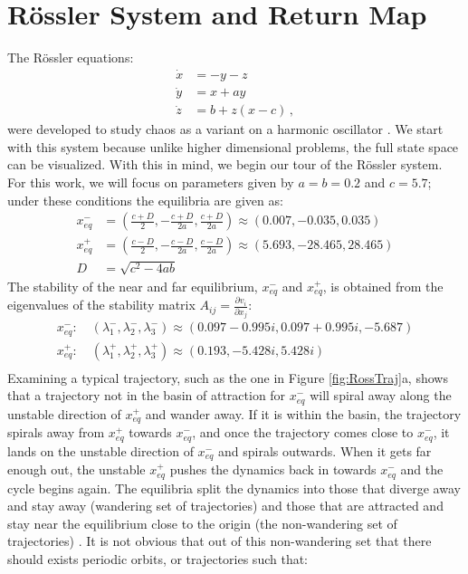 \documentclass[aip,cha,reprint,
secnumarabic,
nofootinbib, tightenlines,
nobibnotes, showkeys, showpacs,
groupedaddress
]{revtex4-1}
\begin{document}
\section{R\"ossler System and Return Map}
\label{sec:Ross}
The R\"ossler equations:
\begin{equation}
\begin{split}
  \dot x &= -y -z \\
  \dot y &= x + a y \\
  \dot z &= b + z (x - c) \,,
  \label{eq:Rossler}
\end{split}
\end{equation}
were developed to study chaos as a variant on a harmonic oscillator \cite{CB}.  We start with this system because unlike higher dimensional problems, the full state space can be visualized.  With this in mind, we begin our tour of the R\"ossler system.
For this work, we will focus on parameters given by $a = b = 0.2$ and $c = 5.7$; under these conditions the equilibria are given as:
\begin{equation}
\begin{split}
x_{eq}^{-} &= (\frac{c+D}{2}, -\frac{c+D}{2a}, \frac{c+D}{2a}) \approx (0.007,-0.035,0.035)\\
x_{eq}^{+} &= (\frac{c-D}{2}, -\frac{c-D}{2a}, \frac{c-D}{2a}) \approx (5.693,-28.465,28.465) \\
D &= \sqrt{c^2-4ab}
\end{split}
\label{eq:RossEq}
\end{equation}
The stability of the near and far equilibrium, $x_{eq}^{-}$ and $x_{eq}^{+}$, is obtained from the eigenvalues of the stability matrix $A_{ij} = \frac{\partial{v_{i}}}{\partial{x_{j}}}$:
\begin{equation}
\begin{split}
x_{eq}^{-} : \quad (\lambda_1^-, \lambda_2^-, \lambda_3^-) \approx (0.097-0.995i, 0.097+0.995i, -5.687) \\
x_{eq}^{+} : \quad (\lambda_1^+, \lambda_2^+, \lambda_3^+) \approx (0.193, -5.428i, 5.428i) \\
\end{split}
\label{eq:RossStab}
\end{equation}
Examining a typical trajectory, such as the one in Figure \ref{fig:RossTraj}a, shows that a trajectory not in the basin of attraction for $x_{eq}^{-}$ will spiral away along the unstable direction of $x_{eq}^{+}$ and wander away.  If it is within the basin, the trajectory spirals away from $x_{eq}^{+}$ towards $x_{eq}^{-}$, and once the trajectory comes close to $x_{eq}^{-}$, it lands on the unstable direction of $x_{eq}^{-}$ and spirals outwards.  When it gets far enough out, the unstable $x_{eq}^{+}$ pushes the dynamics back in towards $x_{eq}^{-}$ and the cycle begins again.  The equilibria split the dynamics into those that diverge away and stay away (wandering set of trajectories) and those that are attracted and stay near the equilibrium close to the origin (the non-wandering set of trajectories) \cite{CB}.  It is not obvious that out of this non-wandering set that there should exists periodic orbits, or trajectories such that:
\end{document}

